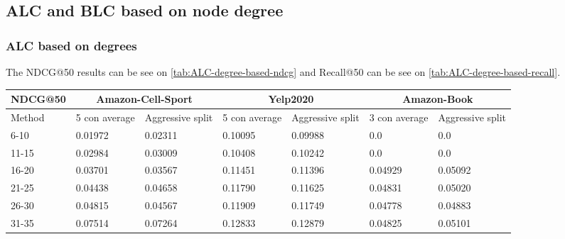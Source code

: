 \subsection{ALC and BLC based on node degree }\label{app:adjusted-layer-combi}


\subsubsection{ALC based on degrees}
The NDCG@50 results can be see on \autoref{tab:ALC-degree-based-ndcg} and Recall@50 can be see on \autoref{tab:ALC-degree-based-recall}.

\begin{table*}[h!]
    \centering
    \begin{tabular}{|l|l|l||l|l||l|l|}
        \hline
        NDCG@50  & \multicolumn{2}{c||}{Amazon-Cell-Sport} & \multicolumn{2}{c||}{Yelp2020} & \multicolumn{2}{c|}{Amazon-Book}                                                       \\ \hline
        Method   & 5 con average                           & Aggressive split               & 5 con average                    & Aggressive split & 3 con average & Aggressive split \\ \hline
        6-10     & 0.01972                                 & 0.02311                        & 0.10095                          & 0.09988          & 0.0           & 0.0              \\ \hline
        11-15    & 0.02984                                 & 0.03009                        & 0.10408                          & 0.10242          & 0.0           & 0.0              \\ \hline
        16-20    & 0.03701                                 & 0.03567                        & 0.11451                          & 0.11396          & 0.04929       & 0.05092          \\ \hline
        21-25    & 0.04438                                 & 0.04658                        & 0.11790                          & 0.11625          & 0.04831       & 0.05020          \\ \hline
        26-30    & 0.04815                                 & 0.04567                        & 0.11909                          & 0.11749          & 0.04778       & 0.04883          \\ \hline
        31-35    & 0.07514                                 & 0.07264                        & 0.12833                          & 0.12879          & 0.04825       & 0.05101          \\ \hline

\end{tabular}
\end{table*}
